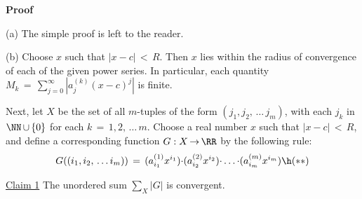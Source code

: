 \V

        {\bf Proof}

\V

        (a) The simple proof is left to the reader.

\V

        (b) Choose $x$ such that $|x-c|\,<\,R$. Then $x$ lies within the radius of convergence of each of the given power series.
    In particular, each quantity $M_{k} \,=\, \sum_{j=0}^{{\infty}} |a^{(k)}_{j}(x-c)^{j}|$ is finite.

        Next, let $X$ be the set of all $m$-tuples of the form $(j_{1},j_{2},\,{\ldots}\,j_{m})$,
    with each $j_{k}$ in ${\NN}\,{\cup}\,\{0\}$ for each $k \,=\, 1,2,\,{\ldots}\,m$.
    Choose a real number $x$ such that $|x-c|\,<\,R$, and define a corresponding function $G:X \,{\rightarrow}\, {\RR}$ by the following rule:
        \begin{displaymath}
        G((i_{1},i_{2},\,{\ldots}\,i_{m})) \,=\, (a^{(1)}_{i_{1}}x^{i_{1}}){\cdot}(a^{(2)}_{i_{2}}x^{i_{2}}){\cdot}\,{\ldots}\,{\cdot}(a^{(m)}_{i_{m}}x^{i_{m}}) \h ({\ast}{\ast})
        \end{displaymath}

        \underline{Claim 1} The unordered sum $\sum_{X} |G|$ is convergent.

